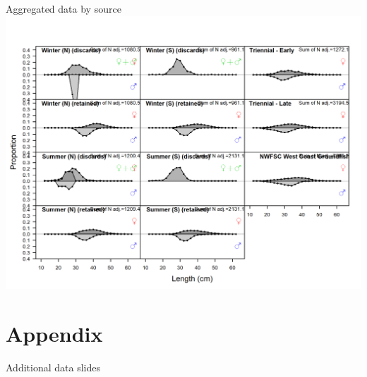 \documentclass[pdf]{beamer}\usepackage[]{graphicx}\usepackage[]{color}
\begin{document}
\begin{frame}{Aggregated data by source}
    \includegraphics[scale = 0.37]{r4ss/comp_lendat__aggregated_across_time.png}
\end{frame}



\section*{Appendix}
\begin{frame}
  \Huge{\centerline{Additional data slides}}
\end{frame}

  
\end{document}
